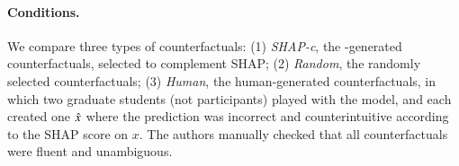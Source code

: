 

\newcommand{\cshap}{\emph{SHAP-c}\xspace}
\newcommand{\crandom}{\emph{Random}\xspace}
\newcommand{\chuman}{\emph{Human}\xspace}
\paragraph{Conditions.} 
We compare three types of counterfactuals:
(1) \cshap, the \sysname-generated counterfactuals, selected to complement SHAP; 
(2) \crandom, the randomly selected \sysname counterfactuals; 
(3) \chuman, the human-generated counterfactuals, in which two graduate students (not participants) played with the model, and each created one $\hat{x}$ where the prediction was incorrect and counterintuitive according to the SHAP score on $x$.
The authors manually checked that all counterfactuals were fluent and unambiguous.

